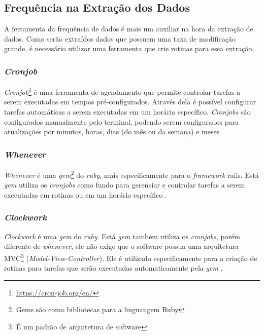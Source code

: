 \subsection{Frequência na Extração dos Dados}
A ferramenta da frequência de dados é mais um auxiliar na hora da extração de dados. Como serão extraídos dados que possuem uma taxa de modificação grande, é necessário utilizar uma ferramenta que crie rotinas para essa extração.
\subsubsection*{\textit{Cronjob}}
\textit{Cronjob}\footnote[5]{\url{https://cron-job.org/en/}} é uma ferramenta de agendamento que permite controlar tarefas a serem executadas em tempos pré-configurados. Através dela é possível configurar tarefas automáticas a serem executadas em um horário específico. \textit{Cronjobs} são configurados manualmente pelo terminal, podendo serem configurados para atualizações por minutos, horas, dias (do mês ou da semana) e meses
\subsubsection*{\textit{Whenever}}
\textit{Whenever} é uma \textit{gem}\footnote[6]{Gems são como bibliotecas para a linguangem Ruby} do \textit{ruby}, mais especificamente para o \textit{framework} rails. Está \textit{gem} utiliza os \textit{cronjobs} como fundo para gerenciar e controlar tarefas a serem executadas em rotinas ou em um horário específico \cite{whenever}.
\subsubsection*{\textit{Clockwork}}
\textit{Clockwork} é uma \textit{gem} do \textit{ruby}. Está \textit{gem} também utiliza os \textit{cronjobs}, porém diferente de \textit{whenever}, ele não exige que o software possua uma arquitetura MVC\footnote[7]{É um padrão de arquitetura de software} (\textit{Model-View-Controller}). Ele é utilizado especificamente para a criação de rotinas para tarefas que serão executadas automaticamente pela \textit{gem} \cite{clockwork}.
